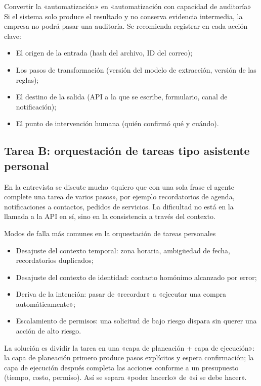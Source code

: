\begin{importantbox}{Convertir la «automatización» en «automatización con capacidad de auditoría»}
Si el sistema solo produce el resultado y no conserva evidencia intermedia, la empresa no podrá pasar una auditoría. Se recomienda registrar en cada acción clave:
\begin{itemize}
    \item El origen de la entrada (hash del archivo, ID del correo);
    \item Los pasos de transformación (versión del modelo de extracción, versión de las reglas);
    \item El destino de la salida (API a la que se escribe, formulario, canal de notificación);
    \item El punto de intervención humana (quién confirmó qué y cuándo).
\end{itemize}
\end{importantbox}

\subsection{Tarea B: orquestación de tareas tipo asistente personal}

En la entrevista se discute mucho «quiero que con una sola frase el agente complete una tarea de varios pasos», por ejemplo recordatorios de agenda, notificaciones a contactos, pedidos de servicios. La dificultad no está en la llamada a la API en sí, sino en la consistencia a través del contexto.

\begin{warningbox}{Modos de falla más comunes en la orquestación de tareas personales}
\begin{itemize}
    \item Desajuste del contexto temporal: zona horaria, ambigüedad de fecha, recordatorios duplicados;
    \item Desajuste del contexto de identidad: contacto homónimo alcanzado por error;
    \item Deriva de la intención: pasar de «recordar» a «ejecutar una compra automáticamente»;
    \item Escalamiento de permisos: una solicitud de bajo riesgo dispara sin querer una acción de alto riesgo.
\end{itemize}
\end{warningbox}

La solución es dividir la tarea en una «capa de planeación + capa de ejecución»: la capa de planeación primero produce pasos explícitos y espera confirmación; la capa de ejecución después completa las acciones conforme a un presupuesto (tiempo, costo, permiso). Así se separa «poder hacerlo» de «si se debe hacer».

